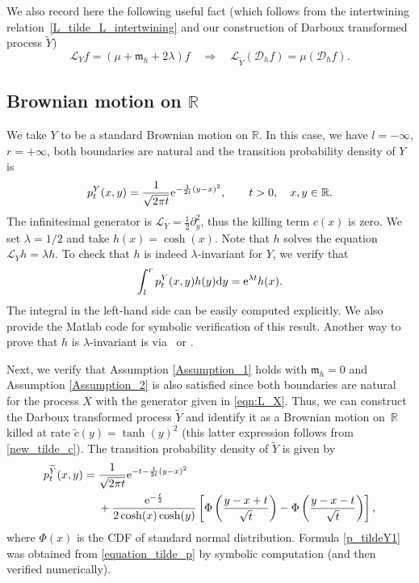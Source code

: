 \documentclass[pdftex]{sigma}
\numberwithin{equation}{section}
\theoremstyle{definition}
\def\L{{\mathcal L}}
\def\r{{\mathbb R}}
\def\d{{\textnormal d}}
\begin{document}
We also record here the following useful fact \big(which follows from the intertwining relation~\eqref{L_tilde_L_intertwining} and our construction of Darboux transformed process $\widetilde Y$\big)
\begin{equation}\label{g_f_intertwining}
  \L_Y f=(\mu+ {\mathfrak m}_h + 2\lambda) f
 \quad \Longrightarrow \quad \L_{\widetilde Y} ({\mathcal D}_h f)=\mu ({\mathcal D}_h f).
\end{equation}

\subsection[Brownian motion on R]{Brownian motion on $\boldsymbol{\r}$}\label{example1}

We take $Y$ to be a standard Brownian motion on $\r$. In this case, we have $l=-\infty$, $r=+\infty$, both boundaries are natural and the transition probability density of $Y$ is
\[
p^Y_t(x,y)=\frac{1}{\sqrt{2\pi t}} {\rm e}^{-\frac{1}{2t} (y-x)^2},\qquad t>0, \quad x,y \in \r.
\]
The infinitesimal generator is $\L_Y=\frac{1}{2} \partial_y^2$, thus the killing term $c(x)$ is zero.
We set $\lambda=1/2$ and take $h(x)=\cosh(x)$. Note that $h$ solves the equation $\L_Y h= \lambda h$. To check that $h$ is indeed $\lambda$-invariant for $Y$, we verify that
\begin{equation}\label{lambda_invariant_h}
\int^r_{l} p^Y_t(x,y) h(y) \d y={\rm e}^{\lambda t} h(x).
\end{equation}
The integral in the left-hand side can be easily computed explicitly. We also provide the {\sc Matlab} code for symbolic verification of this result. Another way to prove that $h$ is $\lambda$-invariant is via~\cite[Theorem 2.7]{Rogers_2021} or \cite[Corollary 2.2]{Mijatovic_2012}.

Next, we verify that Assumption \ref{Assumption_1} holds with ${\mathfrak m}_h=0$ and Assumption \ref{Assumption_2} is also satisfied since both boundaries are natural for the process $X$ with the generator given in \eqref{eqn:L_X}. Thus, we can construct the Darboux transformed process $\widetilde Y$ and identify it as a Brownian motion on~$\r$ killed at rate $\tilde c(y)=\tanh(y)^2$ (this latter expression follows from \eqref{new_tilde_c}).
The transition probability density of $\widetilde Y$ is given by
\begin{align}
p^{\widetilde Y}_t(x,y)={}&\frac{1}{\sqrt{2\pi t}} {\rm e}^{-t-\frac{1}{2t}(y-x)^2}\nonumber\\
&
+ \frac{{\rm e}^{-\frac{t}{2}}}{2\cosh(x) \cosh(y)} \left[
\Phi\left( \frac{y-x+t}{\sqrt{t}} \right) - \Phi\left( \frac{y-x-t}{\sqrt{t}} \right)\right],\label{p_tildeY1}
\end{align}
where $\Phi(x)$ is the CDF of standard normal distribution. Formula \eqref{p_tildeY1} was obtained from
\eqref{equation_tilde_p} by symbolic computation (and then verified numerically).
\end{document}
